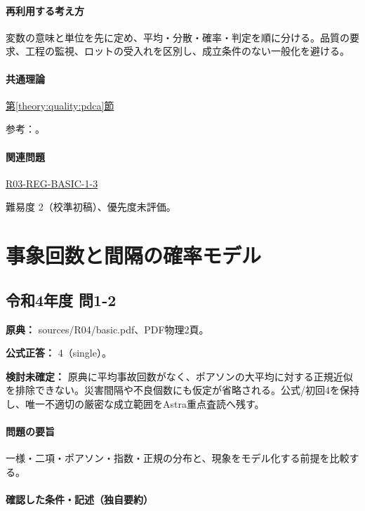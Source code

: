 \paragraph{再利用する考え方} 変数の意味と単位を先に定め、平均・分散・確率・判定を順に分ける。品質の要求、工程の監視、ロットの受入れを区別し、成立条件のない一般化を避ける。

\paragraph{共通理論} \hyperref[theory:quality:pdca]{第\ref*{theory:quality:pdca}節}

\par 参考：\cite{quality_iso_process}。

\paragraph{関連問題} \hyperref[q:r03-reg-basic-1-3]{R03-REG-BASIC-1-3}

\par 難易度 2（校準初稿）、優先度未評価。

\section{事象回数と間隔の確率モデル}

\subsection{令和4年度 問1-2}
\label{q:r04-reg-basic-1-2}

\noindent\textbf{原典：} sources/R04/basic.pdf、PDF物理2頁。

\textbf{公式正答：} 4（single）。

\par\textbf{検討未確定：} 原典に平均事故回数がなく、ポアソンの大平均に対する正規近似を排除できない。災害間隔や不良個数にも仮定が省略される。公式/初回4を保持し、唯一不適切の厳密な成立範囲をAstra重点査読へ残す。

\paragraph{問題の要旨} 一様・二項・ポアソン・指数・正規の分布と、現象をモデル化する前提を比較する。

\paragraph{確認した条件・記述（独自要約）}\mbox{}\par

